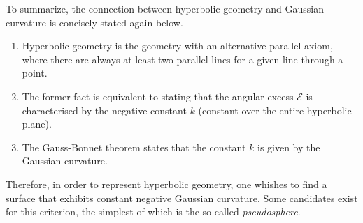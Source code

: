 To summarize, the connection between hyperbolic geometry and Gaussian curvature is concisely stated again below.
\begin{enumerate}
    \item Hyperbolic geometry is the geometry with an alternative parallel axiom, where there are always at least two parallel lines for a given line through a point.
    \item The former fact is equivalent to stating that the angular excess \(\mathcal{E}\) is characterised by the negative constant \(k\) (constant over the entire hyperbolic plane).
    \item The Gauss-Bonnet theorem states that the constant \(k\) is given by the Gaussian curvature.
\end{enumerate}
Therefore, in order to represent hyperbolic geometry, one whishes to find a surface that exhibits constant negative Gaussian curvature. Some candidates exist for this criterion, the simplest of which is the so-called \emph{pseudosphere}.

